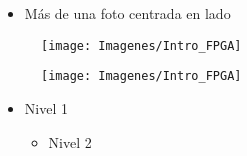 \documentclass[a4,landscpae]{seminar}
\begin{document}



\begin{hslide}
\slsubsect{}
\begin{minipage}{5cm}
	\begin{itemize}
		\item M\'as de una foto centrada en lado
	\end{itemize}
\end{minipage} \hfill
\begin{minipage}{2cm}
	\begin{center}
		\begin{figure}
			\texttt{[image: Imagenes/Intro\_FPGA]}
		\end{figure}
	\end{center}
\end{minipage} \hfill
\begin{minipage}{2cm}
	\begin{center}
		\begin{figure}
			\texttt{[image: Imagenes/Intro\_FPGA]}
		\end{figure}
	\end{center}
\end{minipage}
\end{hslide}



\begin{hslide}
\begin{minipage}{7cm}
	\begin{itemize}
		\item Nivel 1
		\begin{itemize}
			\item Nivel 2
		\end{itemize}
	\end{itemize}
\end{minipage} \hfill
\end{hslide}


\begin{hslide}

\end{hslide}

\end{document}
